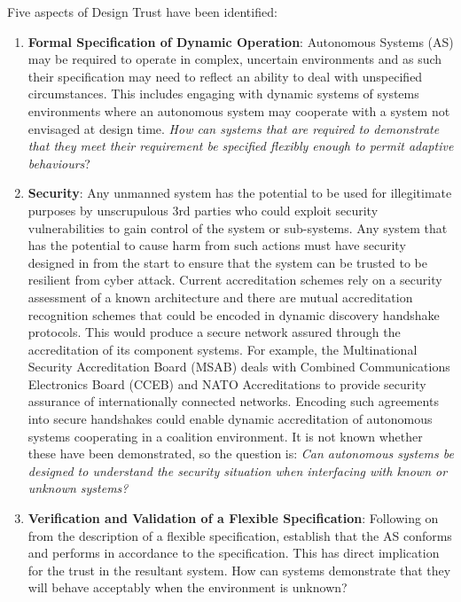 Five aspects of Design Trust have been identified: 
\begin{enumerate}
  \item \textbf{Formal Specification of Dynamic Operation}: Autonomous Systems (AS) may be required to operate in complex, uncertain environments and as such their specification may need to reflect an ability to deal with unspecified circumstances.
    This includes engaging with dynamic systems of systems environments where an autonomous system may cooperate with a system not envisaged at design time.
    \textit{How can systems that are required to demonstrate that they meet their requirement be specified flexibly enough to permit adaptive behaviours}?
  \item \textbf{Security}: Any unmanned system has the potential to be used for illegitimate purposes by unscrupulous 3rd parties who could exploit security vulnerabilities to gain control of the system or sub-systems.
    Any system that has the potential to cause harm from such actions must have security designed in from the start to ensure that the system can be trusted to be resilient from cyber attack.
    Current accreditation schemes rely on a security assessment of a known architecture and there are mutual accreditation recognition schemes that could be encoded in dynamic discovery handshake protocols.
    This would produce a secure network assured through the accreditation of its component systems.
    For example, the Multinational Security Accreditation Board (MSAB) deals with Combined Communications Electronics Board (CCEB) and NATO Accreditations to provide security assurance of internationally connected networks.
    Encoding such agreements into secure handshakes could enable dynamic accreditation of autonomous systems cooperating in a coalition environment.
    It is not known whether these have been demonstrated, so the question is: \textit{Can autonomous systems be designed to understand the security situation when interfacing with known or unknown systems?}
  \item \textbf{Verification and Validation of a Flexible Specification}: Following on from the description of a flexible specification, establish that the AS conforms and performs in accordance to the specification.
    This has direct implication for the trust in the resultant system.
    How can systems demonstrate that they will behave acceptably when the environment is unknown?

\end{enumerate}

